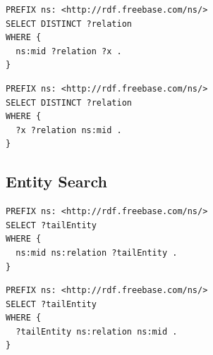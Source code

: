 \documentclass{article}
\begin{document}
\begin{lstlisting}[language=SPARQL,style=mystyle]
PREFIX ns: <http://rdf.freebase.com/ns/>
SELECT DISTINCT ?relation
WHERE {
  ns:mid ?relation ?x .
}
\end{lstlisting}

\begin{lstlisting}[language=SPARQL,style=mystyle]
PREFIX ns: <http://rdf.freebase.com/ns/>
SELECT DISTINCT ?relation
WHERE {
  ?x ?relation ns:mid .
}
\end{lstlisting}


\subsection{Entity Search}
\label{Apx:queryent}
\begin{lstlisting}[language=SPARQL,style=mystyle]
PREFIX ns: <http://rdf.freebase.com/ns/>
SELECT ?tailEntity
WHERE {
  ns:mid ns:relation ?tailEntity .
}
\end{lstlisting}
\begin{lstlisting}[language=SPARQL,style=mystyle]
PREFIX ns: <http://rdf.freebase.com/ns/>
SELECT ?tailEntity
WHERE {
  ?tailEntity ns:relation ns:mid .
}

\end{lstlisting}


\end{document}
